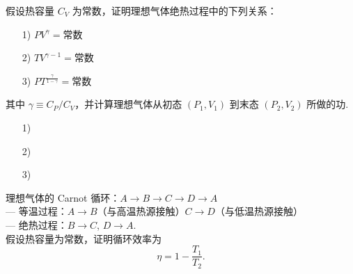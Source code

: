 \documentclass{assignment}
\begin{document}
\begin{prob}
    假设热容量 $C_V$ 为常数，证明理想气体绝热过程中的下列关系：
    \begin{itemize}
        \item[1)] $PV^{\gamma}=$常数
        \item[2)] $TV^{\gamma-1}=$常数
        \item[3)] $PT^{\frac{\gamma}{1-\gamma}}=$常数
    \end{itemize}
    其中 $\gamma\equiv C_P/C_V$，并计算理想气体从初态 $(P_1,V_1)$ 到末态 $(P_2,V_2)$ 所做的功.
\end{prob}
\begin{sol}
    \begin{itemize}
        \item[1)] 
        \item[2)] 
        \item[3)] 
    \end{itemize}
\end{sol}

\begin{prob}
    理想气体的 Carnot 循环：$A\rightarrow B\rightarrow C\rightarrow D\rightarrow A$\\
    --- 等温过程：$A\rightarrow B$（与高温热源接触）$C\rightarrow D$（与低温热源接触）\\
    --- 绝热过程：$B\rightarrow C$, $D\rightarrow A$.\\
    假设热容量为常数，证明循环效率为
    \[
        \eta=1-\frac{T_1}{T_2}.
    \]
\end{prob}
\begin{pf}
    
\end{pf}
\end{document}
